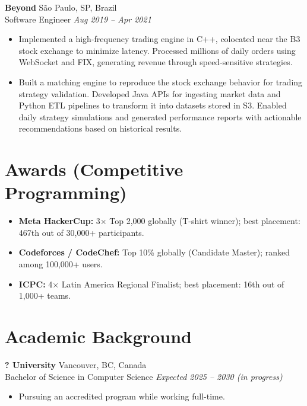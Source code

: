 \documentclass[a4paper,10pt]{article}
\begin{document}
\textbf{Beyond}
    \hfill São Paulo, SP, Brazil 
    \\ Software Engineer
    \hfill \textit{Aug 2019 – Apr 2021}
\begin{itemize}
    \item Implemented a high-frequency trading engine in C++, colocated near the B3 stock exchange to minimize latency. Processed millions of daily orders using WebSocket and FIX, generating revenue through speed-sensitive strategies.
    \item Built a matching engine to reproduce the stock exchange behavior for trading strategy validation. Developed Java APIs for ingesting market data and Python ETL pipelines to transform it into datasets stored in S3. Enabled daily strategy simulations and generated performance reports with actionable recommendations based on historical results.
\end{itemize}

\section*{Awards (Competitive Programming)}
\begin{itemize}
    \item \textbf{Meta HackerCup:} 3× Top 2,000 globally (T-shirt winner); best placement: 467th out of 30,000+ participants.
    \item \textbf{Codeforces / CodeChef:} Top 10\% globally (Candidate Master); ranked among 100,000+ users.
    \item \textbf{ICPC:} 4× Latin America Regional Finalist; best placement: 16th out of 1,000+ teams.
\end{itemize}

\section*{Academic Background}

\textbf{? University} 
    \hfill Vancouver, BC, Canada
    \\Bachelor of Science in Computer Science
    \hfill \textit{Expected 2025 – 2030 (in progress)}
\begin{itemize}
    \item Pursuing an accredited program while working full-time.
\end{itemize}
\end{document}
